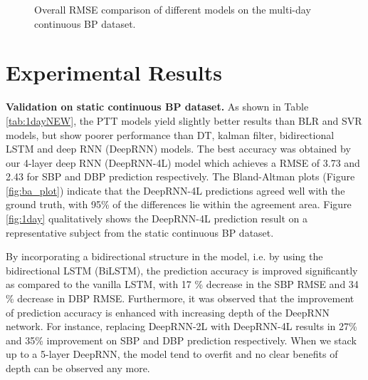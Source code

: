 \documentclass[letterpaper, 10 pt, conference]{ieeeconf}
\begin{document}
\begin{figure*}
    \centering
    \quad
    \caption{Overall RMSE comparison of different models on the multi-day continuous BP dataset.}
    \label{fig:4day_rmse}
\end{figure*}



\section{Experimental Results}
\textbf{Validation on static continuous BP dataset.}
As shown in Table \ref{tab:1dayNEW}, the PTT models yield slightly better results than BLR and SVR models, but show poorer performance than DT, kalman filter, bidirectional LSTM and deep RNN (DeepRNN) models.
The best accuracy was obtained by our 4-layer deep RNN (DeepRNN-4L) model which achieves a RMSE of 3.73 and 2.43 for SBP and DBP prediction respectively.
The Bland-Altman plots (Figure \ref{fig:ba_plot}) indicate that the DeepRNN-4L predictions agreed well with the ground truth, with 95\% of the differences lie within the agreement area.
Figure \ref{fig:1day} qualitatively shows the DeepRNN-4L prediction result on a representative subject from the static continuous BP dataset.

By incorporating a bidirectional structure in the model,
i.e. by using the bidirectional LSTM (BiLSTM), the
prediction accuracy is improved significantly as compared to the vanilla LSTM, with 17 \% decrease in the SBP RMSE and 34 \% decrease in DBP RMSE.  
Furthermore, it was observed that the improvement of prediction accuracy is enhanced with increasing depth of the DeepRNN network.
For instance, replacing DeepRNN-2L with DeepRNN-4L results in 27\% and 35\% improvement on SBP and DBP prediction respectively.
When we stack up to a 5-layer DeepRNN, the model tend to overfit and no clear benefits of depth can be observed any more.
\end{document}
